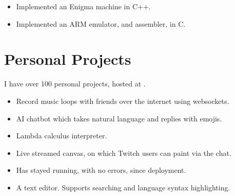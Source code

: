 \documentclass{jcgcv}
\begin{document}
\begin{column}
\begin{adjustwidth}{0.3cm}{}
\begin{itemize}
  \item Implemented an Enigma machine in C++.
\end{itemize}

\begin{itemize}
  \item Implemented an ARM emulator, and assembler, in C.
\end{itemize}

\end{adjustwidth}



\section{Personal Projects}

I have over 100 personal projects, hosted at .

\vspace{2pt}

\begin{itemize}
  \item Record music loops with friends over the internet using websockets.
\end{itemize}

\begin{itemize}
  \item AI chatbot which takes natural language and replies with emojis.
\end{itemize}

\begin{itemize}
  \item Lambda calculus interpreter.
\end{itemize}

\begin{itemize}
  \item Live streamed canvas, on which Twitch users can paint via the chat.
  \item Has stayed running, with no errors, since deployment.
\end{itemize}

\begin{itemize}
  \item A text editor. Supports searching and language syntax highlighting.
\end{itemize}


\end{column}
\end{document}
